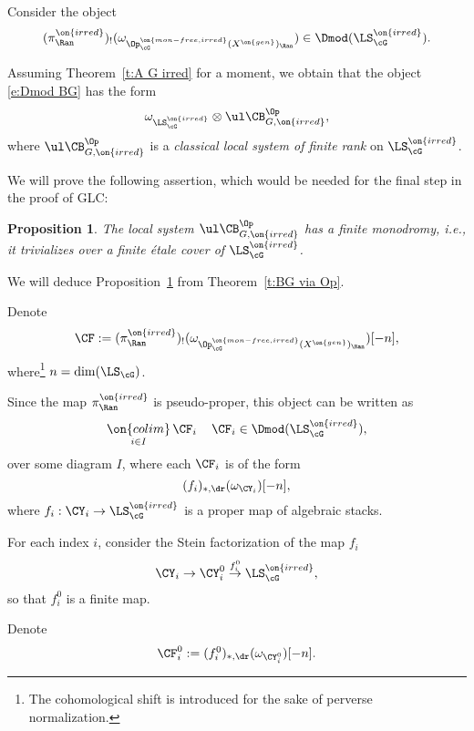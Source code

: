 \documentclass[9pt]{amsart}
\newtheorem{prop}[subsubsection]{Proposition}
\theoremstyle{remark}
\theoremstyle{definition}
\theoremstyle{remark}
\newcommand{\thmref}[1]{Theorem~\ref{#1}}
\newcommand{\propref}[1]{Proposition~\ref{#1}}
\numberwithin{equation}{section}
\begin{document}
\sssec{}

Consider the object
\begin{equation} \label{e:Dmod BG}
(\pi^{\on{irred}}_\Ran)_!(\omega_{\Op^{\on{mon-free,irred}}_\cG(X^{\on{gen}})_\Ran})\in \Dmod(\LS^{\on{irred}}_\cG).
\end{equation} 

Assuming \thmref{t:A G irred} for a moment, we obtain that the object \eqref{e:Dmod BG} has the form
$$\omega_{\LS^{\on{irred}}_\cG}\otimes \ul\CB^{\Op}_{G,\on{irred}},$$
where
$\ul\CB^{\Op}_{G,\on{irred}}$ is a \emph{classical local system of finite rank} on $\LS^{\on{irred}}_\cG$.

\medskip

We will prove the following assertion, which would be needed for the final step in the proof of GLC:

\begin{prop} \label{p:finite monodromy}
The local system $\ul\CB^{\Op}_{G,\on{irred}}$ has a finite monodromy, i.e., it trivializes over a finite \'etale
cover of $\LS^{\on{irred}}_\cG$.
\end{prop} 

\ssec{Proof of \propref{p:finite monodromy}} \label{ss:proof finite momod}

We will deduce \propref{p:finite monodromy} from \thmref{t:BG via Op}. 

\sssec{}

Denote
$$\CF:=(\pi^{\on{irred}}_\Ran)_!(\omega_{\Op^{\on{mon-free,irred}}_\cG(X^{\on{gen}})_\Ran})[-n],$$
where\footnote{The cohomological shift is introduced for the sake of perverse normalization.} $n=\dim(\LS_\cG)$.

\medskip

Since the map $\pi^{\on{irred}}_\Ran$ is pseudo-proper, this object can be written as
$$\underset{i\in I}{\on{colim}}\, \CF_i\, \quad \CF_i\in \Dmod(\LS_\cG^{\on{irred}}),$$
over some diagram $I$, where each $\CF_i$ is of the form
$$(f_i)_{*,\dr}(\omega_{\CY_i})[-n],$$
where $f_i:\CY_i\to \LS_\cG^{\on{irred}}$ is a proper map of algebraic stacks. 

\medskip

For each index $i$, consider the Stein factorization of the map $f_i$
$$\CY_i\to \CY^0_i \overset{f^0_i}\to \LS_\cG^{\on{irred}},$$
so that $f^0_i$ is a finite map.

\medskip

Denote 
$$\CF_i^0:=(f^0_i)_{*,\dr}(\omega_{\CY^0_i})[-n].$$

\sssec{}
\end{document}
